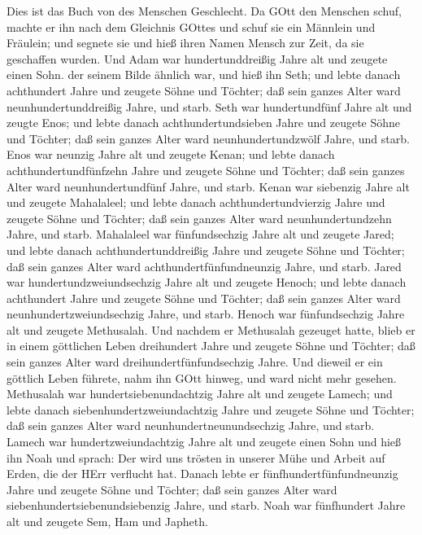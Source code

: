  Dies ist das Buch von des Menschen Geschlecht. Da GOtt den
Menschen schuf, machte er ihn nach dem Gleichnis GOttes  und
schuf sie ein Männlein und Fräulein; und segnete sie und hieß ihren
Namen Mensch zur Zeit, da sie geschaffen wurden.  Und Adam
war hundertunddreißig Jahre alt und zeugete einen Sohn. der seinem Bilde
ähnlich war, und hieß ihn Seth;  und lebte danach
achthundert Jahre und zeugete Söhne und Töchter;  daß sein
ganzes Alter ward neunhundertunddreißig Jahre, und starb. 
Seth war hundertundfünf Jahre alt und zeugte Enos;  und
lebte danach achthundertundsieben Jahre und zeugete Söhne und Töchter;
 daß sein ganzes Alter ward neunhundertundzwölf Jahre, und
starb.  Enos war neunzig Jahre alt und zeugete Kenan;
 und lebte danach achthundertundfünfzehn Jahre und zeugete
Söhne und Töchter;  daß sein ganzes Alter ward
neunhundertundfünf Jahre, und starb.  Kenan war siebenzig
Jahre alt und zeugete Mahalaleel;  und lebte danach
achthundertundvierzig Jahre und zeugete Söhne und Töchter; 
daß sein ganzes Alter ward neunhundertundzehn Jahre, und starb.
 Mahalaleel war fünfundsechzig Jahre alt und zeugete Jared;
 und lebte danach achthundertunddreißig Jahre und zeugete
Söhne und Töchter;  daß sein ganzes Alter ward
achthundertfünfundneunzig Jahre, und starb.  Jared war
hundertundzweiundsechzig Jahre alt und zeugete Henoch;  und
lebte danach achthundert Jahre und zeugete Söhne und Töchter;
 daß sein ganzes Alter ward neunhundertzweiundsechzig
Jahre, und starb.  Henoch war fünfundsechzig Jahre alt und
zeugete Methusalah.  Und nachdem er Methusalah gezeuget
hatte, blieb er in einem göttlichen Leben dreihundert Jahre und zeugete
Söhne und Töchter;  daß sein ganzes Alter ward
dreihundertfünfundsechzig Jahre.  Und dieweil er ein
göttlich Leben führete, nahm ihn GOtt hinweg, und ward nicht mehr
gesehen.  Methusalah war hundertsiebenundachtzig Jahre alt
und zeugete Lamech;  und lebte danach
siebenhundertzweiundachtzig Jahre und zeugete Söhne und Töchter;
 daß sein ganzes Alter ward neunhundertneunundsechzig
Jahre, und starb.  Lamech war hundertzweiundachtzig Jahre
alt und zeugete einen Sohn  und hieß ihn Noah und sprach:
Der wird uns trösten in unserer Mühe und Arbeit auf Erden, die der HErr
verflucht hat.  Danach lebte er fünfhundertfünfundneunzig
Jahre und zeugete Söhne und Töchter;  daß sein ganzes Alter
ward siebenhundertsiebenundsiebenzig Jahre, und starb. 
Noah war fünfhundert Jahre alt und zeugete Sem, Ham und Japheth.

